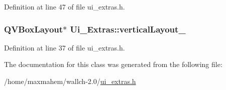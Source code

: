 Definition at line 47 of file ui\_\-extras.h.

\hypertarget{classUi__Extras_a20949d17f93ae9a7fd7a3f2cf309ccad}{
\subsubsection[{verticalLayout\_\-7}]{\setlength{\rightskip}{0pt plus 5cm}QVBoxLayout$\ast$ {\bf Ui\_\-Extras::verticalLayout\_}}}
\label{classUi__Extras_a20949d17f93ae9a7fd7a3f2cf309ccad}


Definition at line 37 of file ui\_\-extras.h.



The documentation for this class was generated from the following file:\begin{DoxyCompactItemize}
\item 
/home/maxmahem/wallch-\/2.0/\hyperlink{ui__extras_8h}{ui\_\-extras.h}\end{DoxyCompactItemize}
